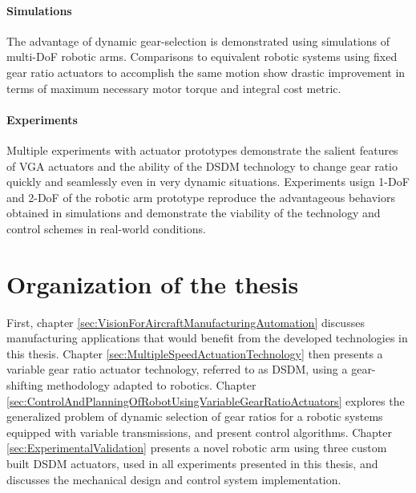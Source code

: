 \paragraph{Simulations}
%
The advantage of dynamic gear-selection is demonstrated using simulations of multi-DoF robotic arms. Comparisons to equivalent robotic systems using fixed gear ratio actuators to accomplish the same motion show drastic improvement in terms of maximum necessary motor torque and integral cost metric. 

\paragraph{Experiments}
%
Multiple experiments with actuator prototypes demonstrate the salient features of VGA actuators and the ability of the DSDM technology to change gear ratio quickly and seamlessly even in very dynamic situations. Experiments usign 1-DoF and 2-DoF of the robotic arm prototype reproduce the advantageous behaviors obtained in simulations and demonstrate the viability of the technology and control schemes in real-world conditions.


\section{Organization of the thesis}
\label{sec:OrganisationOfTheThesis}

First, chapter \ref{sec:VisionForAircraftManufacturingAutomation} discusses manufacturing applications that would benefit from the developed technologies in this thesis. Chapter \ref{sec:MultipleSpeedActuationTechnology} then presents a variable gear ratio actuator technology, referred to as DSDM, using a gear-shifting methodology adapted to robotics. Chapter \ref{sec:ControlAndPlanningOfRobotUsingVariableGearRatioActuators} explores the generalized problem of dynamic selection of gear ratios for a robotic systems equipped with variable transmissions, and present control algorithms. Chapter \ref{sec:ExperimentalValidation} presents a novel robotic arm using three custom built DSDM actuators, used in all experiments presented in this thesis, and discusses the mechanical design and control system implementation. %


